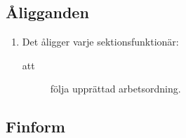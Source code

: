 \documentclass[11pt,a4paper]{article}
\begin{document}
\subsection{Åligganden}

\begin{enumerate}[\thesubsection .1]

  \item Det åligger varje sektionsfunktionär:
    \begin{description}
    \item[att] följa upprättad arbetsordning.
  
    \end{description}

\end{enumerate}

\subsection{Finform}
\end{document}
